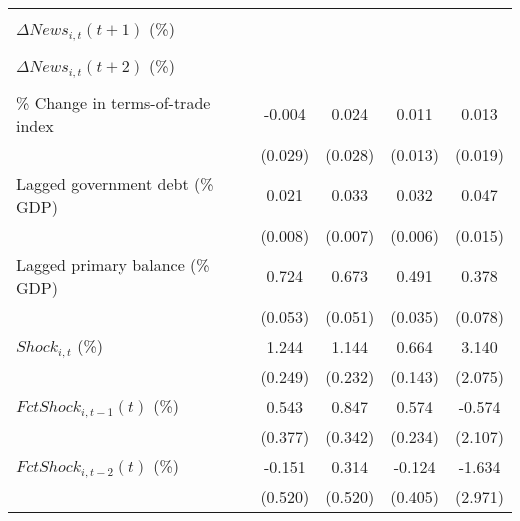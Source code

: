{\begin{tabular}{l*{4}{c}}
                    &                     &                     &                     &                     \\
\addlinespace
$ \Delta News_{i,t}(t+1)$ (\%)&                     &                     &                     &                     \\
                    &                     &                     &                     &                     \\
\addlinespace
$ \Delta News_{i,t}(t+2)$ (\%)&                     &                     &                     &                     \\
                    &                     &                     &                     &                     \\
\addlinespace
\% Change in terms-of-trade index&      -0.004         &       0.024         &       0.011         &       0.013         \\
                    &     (0.029)         &     (0.028)         &     (0.013)         &     (0.019)         \\
\addlinespace
Lagged government debt (\% GDP)&       0.021\sym{**} &       0.033\sym{***}&       0.032\sym{***}&       0.047\sym{***}\\
                    &     (0.008)         &     (0.007)         &     (0.006)         &     (0.015)         \\
\addlinespace
Lagged primary balance (\% GDP)&       0.724\sym{***}&       0.673\sym{***}&       0.491\sym{***}&       0.378\sym{***}\\
                    &     (0.053)         &     (0.051)         &     (0.035)         &     (0.078)         \\
\addlinespace
$ Shock_{i,t}$ (\%) &       1.244\sym{***}&       1.144\sym{***}&       0.664\sym{***}&       3.140         \\
                    &     (0.249)         &     (0.232)         &     (0.143)         &     (2.075)         \\
\addlinespace
$ FctShock_{i,t-1}(t)$ (\%)&       0.543         &       0.847\sym{**} &       0.574\sym{**} &      -0.574         \\
                    &     (0.377)         &     (0.342)         &     (0.234)         &     (2.107)         \\
\addlinespace
$ FctShock_{i,t-2}(t)$ (\%)&      -0.151         &       0.314         &      -0.124         &      -1.634         \\
                    &     (0.520)         &     (0.520)         &     (0.405)         &     (2.971)         \\

\end{tabular}}
